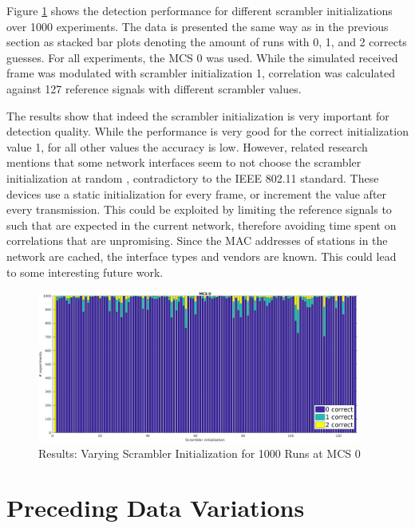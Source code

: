 Figure \ref{fig:vary_scrambler} shows the detection performance for different scrambler initializations over 1000 experiments. The data is presented the same way as in the previous section as stacked bar plots denoting the amount of runs with 0, 1, and 2 corrects guesses. For all experiments, the \gls{MCS} 0 was used. While the simulated received frame was modulated with scrambler initialization 1, correlation was calculated against 127 reference signals with different scrambler values.

The results show that indeed the scrambler initialization is very important for detection quality. While the performance is very good for the correct initialization value 1, for all other values the accuracy is low. However, related research mentions that some network interfaces seem to not choose the scrambler initialization at random \cite{noubir2016}, contradictory to the IEEE 802.11 standard. These devices use a static initialization for every frame, or increment the value after every transmission. This could be exploited by limiting the reference signals to such that are expected in the current network, therefore avoiding time spent on correlations that are unpromising. Since the \gls{MAC} addresses of stations in the network are cached, the interface types and vendors are known. This could lead to some interesting future work.

\begin{figure}[H]
	\centering
	\includegraphics[height=5cm]{gfx/plots/scrambler}
	\caption[Results: Varying Scrambler Initialization for 1000 Experiments]{Results: Varying Scrambler Initialization for 1000 Runs at MCS 0}
	\label{fig:vary_scrambler}
\end{figure}



\section{Preceding Data Variations}\label{sec:ex-destination}

